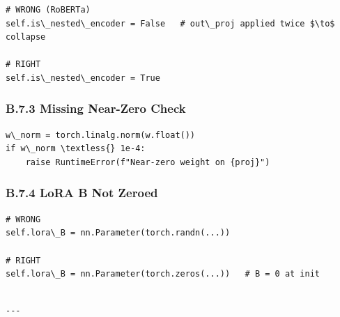 \begin{lstlisting}
# WRONG (RoBERTa)
self.is\_nested\_encoder = False   # out\_proj applied twice $\to$ collapse

# RIGHT
self.is\_nested\_encoder = True
\end{lstlisting}

\subsubsection{B.7.3 Missing Near-Zero Check}

\begin{lstlisting}
w\_norm = torch.linalg.norm(w.float())
if w\_norm \textless{} 1e-4:
    raise RuntimeError(f"Near-zero weight on {proj}")
\end{lstlisting}

\subsubsection{B.7.4 LoRA B Not Zeroed}

\begin{lstlisting}
# WRONG
self.lora\_B = nn.Parameter(torch.randn(...))

# RIGHT
self.lora\_B = nn.Parameter(torch.zeros(...))   # B = 0 at init
\end{lstlisting}
\begin{lstlisting}

---
\end{lstlisting}